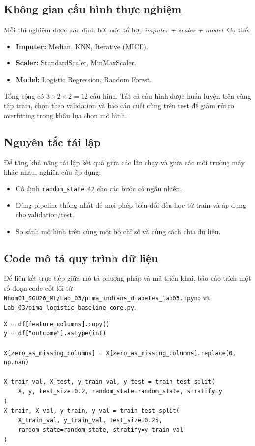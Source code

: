 \subsection{Không gian cấu hình thực nghiệm}
Mỗi thí nghiệm được xác định bởi một tổ hợp \textit{imputer + scaler + model}. Cụ thể:
\begin{itemize}[leftmargin=1.5em]
    \item \textbf{Imputer:} Median, KNN, Iterative (MICE).
    \item \textbf{Scaler:} StandardScaler, MinMaxScaler.
    \item \textbf{Model:} Logistic Regression, Random Forest.
\end{itemize}

Tổng cộng có \(3 \times 2 \times 2 = 12\) cấu hình. Tất cả cấu hình được huấn luyện trên cùng tập train,
chọn theo validation và báo cáo cuối cùng trên test để giảm rủi ro overfitting trong khâu lựa chọn mô hình.

\subsection{Nguyên tắc tái lập}
Để tăng khả năng tái lập kết quả giữa các lần chạy và giữa các môi trường máy khác nhau, nghiên cứu áp dụng:
\begin{itemize}[leftmargin=1.5em]
    \item Cố định \texttt{random\_state=42} cho các bước có ngẫu nhiên.
    \item Dùng pipeline thống nhất để mọi phép biến đổi đều học từ train và áp dụng cho validation/test.
    \item So sánh mô hình trên cùng một bộ chỉ số và cùng cách chia dữ liệu.
\end{itemize}

\subsection{Code mô tả quy trình dữ liệu}
Để liên kết trực tiếp giữa mô tả phương pháp và mã triển khai, báo cáo trích một số đoạn code cốt lõi từ
\texttt{Nhom01\_SGU26\_ML/Lab\_03/pima\_indians\_diabetes\_lab03.ipynb} và
\texttt{Lab\_03/pima\_logistic\_baseline\_core.py}.

\begin{lstlisting}[caption={Nạp dữ liệu, áp dụng zero-as-missing và chia train/val/test có stratify}]
X = df[feature_columns].copy()
y = df["outcome"].astype(int)

X[zero_as_missing_columns] = X[zero_as_missing_columns].replace(0, np.nan)

X_train_val, X_test, y_train_val, y_test = train_test_split(
    X, y, test_size=0.2, random_state=random_state, stratify=y
)
X_train, X_val, y_train, y_val = train_test_split(
    X_train_val, y_train_val, test_size=0.25,
    random_state=random_state, stratify=y_train_val
)
\end{lstlisting}


